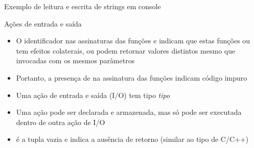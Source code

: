 \begin{frame}[fragile]{Exemplo de leitura e escrita de strings em console}
\end{frame}

\begin{frame}[fragile]{Ações de entrada e saída}

    \begin{itemize}
        \item O identificador  nas assinaturas das funções
             e  indicam que estas funções
            ou tem efeitos colaterais, ou podem retornar valores distintos mesmo que invocadas
            com os mesmos parâmetros

        \item Portanto, a presença de  na assinatura das funções indicam 
            código impuro

        \item Uma ação de entrada e saída (I/O) tem tipo  \textit{tipo}

        \item Uma ação pode ser declarada e armazenada, mas só pode ser executada dentro de outra
            ação de I/O

        \item {} é a tupla vazia e indica a ausência de retorno (similar ao tipo
             de C/C++)

    \end{itemize}

\end{frame}

